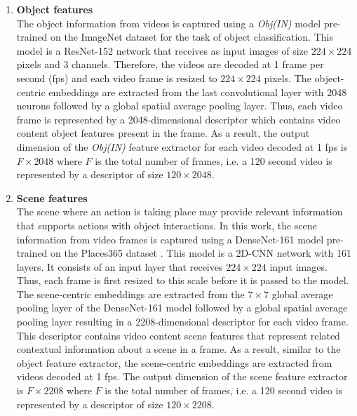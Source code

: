 \documentclass[review]{elsarticle}
\begin{document}
\begin{enumerate}[label = \Alph*.]

\item \textbf{Object features\\}
The object information from videos is captured using a \textit{Obj(IN)} model pre-trained on the ImageNet dataset \citep{deng2009imagenet} for the task of object classification. This model is a ResNet-152 network \citep{he2016deep} that receives as input images of size $224\times224$ pixels and 3 channels. Therefore, the videos are decoded at 1 frame per second (fps) and each video frame is resized to $224\times224$ pixels. The object-centric embeddings are extracted from the last convolutional layer with 2048 neurons followed by a global spatial average pooling layer. Thus, each video frame is represented by a 2048-dimensional descriptor which contains video content object features present in the frame. As a result, the output dimension of the \textit{Obj(IN)} feature extractor for each video decoded at 1 fps is $F \times 2048$ where $F$ is the total number of frames, i.e. a 120 second video is represented by a descriptor of size $120 \times 2048$.  

   


\item \textbf{Scene features\\}
The scene where an action is taking place may provide relevant information that supports actions with object interactions. In this work, the scene information from video frames is captured using a DenseNet-161 model \citep{huang2017densely} pre-trained on the Places365 dataset \citep{zhou2017places}. This model is a 2D-\ac{CNN} network with 161 layers. It consists of an input layer that receives $224\times224$ input images. Thus, each frame is first resized to this scale before it is passed to the model. The scene-centric embeddings are extracted from the $7\times7$ global average pooling layer of the DenseNet-161 model \citep{huang2017densely} followed by a global spatial average pooling layer resulting in a 2208-dimensional descriptor for each video frame. This descriptor contains video content scene features that represent related contextual information about a scene in a frame. As a result, similar to the object feature extractor, the scene-centric embeddings are extracted from  videos  decoded  at  1 fps. The output dimension of the scene feature extractor is $F \times 2208$ where $F$ is the total number of frames, i.e. a 120 second video is represented by a descriptor of size $120 \times 2208$.  


\end{enumerate}
\end{document}
